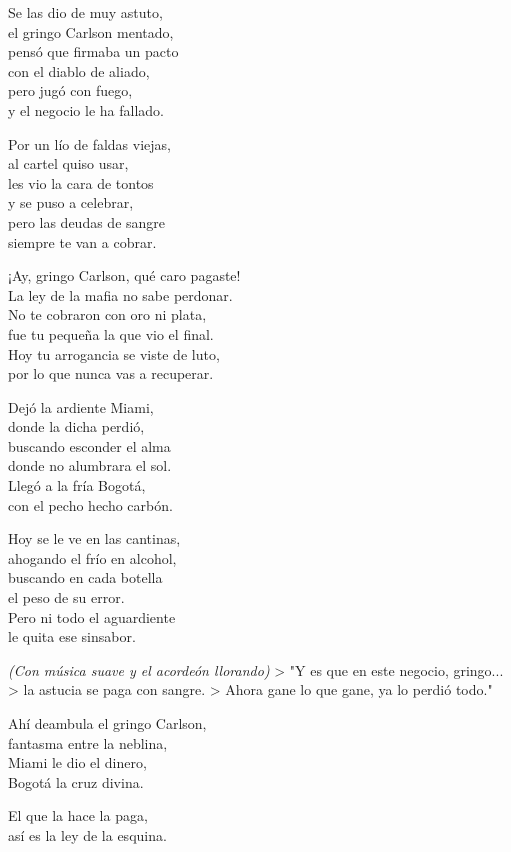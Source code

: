 \begin{lyrics}

Se las dio de muy astuto,\\
el gringo Carlson mentado,\\
pensó que firmaba un pacto\\
con el diablo de aliado,\\
pero jugó con fuego,\\
y el negocio le ha fallado.

Por un lío de faldas viejas,\\
al cartel quiso usar,\\
les vio la cara de tontos\\
y se puso a celebrar,\\
pero las deudas de sangre\\
siempre te van a cobrar.

¡Ay, gringo Carlson, qué caro pagaste!\\
La ley de la mafia no sabe perdonar.\\
No te cobraron con oro ni plata,\\
fue tu pequeña la que vio el final.\\
Hoy tu arrogancia se viste de luto,\\
por lo que nunca vas a recuperar.

Dejó la ardiente Miami,\\
donde la dicha perdió,\\
buscando esconder el alma\\
donde no alumbrara el sol.\\
Llegó a la fría Bogotá,\\
con el pecho hecho carbón.

Hoy se le ve en las cantinas,\\
ahogando el frío en alcohol,\\
buscando en cada botella\\
el peso de su error.\\
Pero ni todo el aguardiente\\
le quita ese sinsabor.

\emph{(Con música suave y el acordeón llorando)}
> "Y es que en este negocio, gringo...
> la astucia se paga con sangre.
> Ahora gane lo que gane, ya lo perdió todo."

Ahí deambula el gringo Carlson,\\
fantasma entre la neblina,\\
Miami le dio el dinero,\\
Bogotá la cruz divina.

El que la hace la paga,\\
así es la ley de la esquina.

\end{lyrics}

